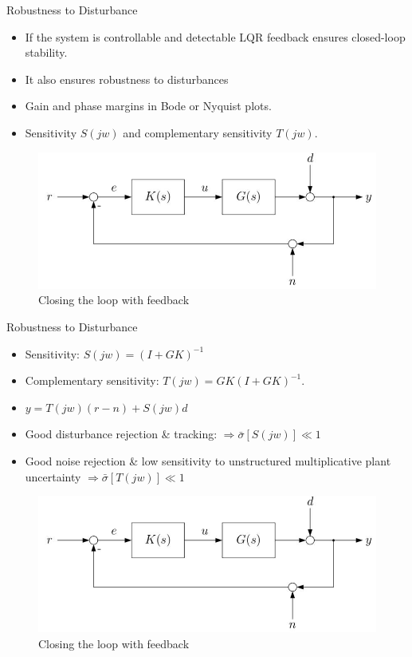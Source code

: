 \documentclass[handout]{beamer}
\begin{document}
%
\begin{frame}{Robustness to Disturbance}
\begin{itemize}
\item If the system is controllable and detectable LQR feedback ensures closed-loop stability.
\item It also ensures robustness to disturbances
\item Gain and phase margins in Bode or Nyquist plots.
\item Sensitivity $S(jw)$ and complementary sensitivity $T(jw)$.
\end{itemize}
\begin{figure}
\center
\includegraphics[scale=0.4]{closedLoop.jpg}	
\caption{Closing the loop with feedback}
\end{figure}
\end{frame}
%
\begin{frame}{Robustness to Disturbance}
\begin{itemize}
\item Sensitivity: $S(jw) = (I + GK)^{-1}$
\item Complementary sensitivity: $T(jw) = GK(I + GK)^{-1}$.
\item $y = T(jw)(r - n) + S(jw)d$
\item Good disturbance rejection \& tracking: $\Rightarrow \bar{\sigma}[S(jw)] \ll 1$
\item Good noise rejection \& low sensitivity to unstructured multiplicative plant uncertainty $\Rightarrow \bar{\sigma}[T(jw)] \ll 1$
\end{itemize}
\begin{figure}
\center
\includegraphics[scale=0.4]{closedLoop.jpg}	
\caption{Closing the loop with feedback}
\end{figure}
\end{frame}
\end{document}
